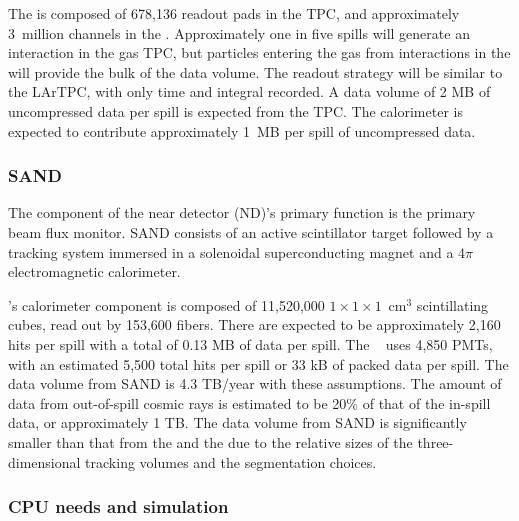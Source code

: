 The  is composed of 678,136 readout pads in the TPC, and approximately 3~million channels in the .  Approximately one in five spills will generate an interaction in the gas TPC, but particles entering the gas from interactions in the  will provide the bulk of the data volume.  The readout strategy will be similar to the LArTPC, with only time and integral recorded. A  data volume of 2 MB of uncompressed data per spill is expected from the TPC.  The calorimeter is expected to contribute approximately 1~MB per spill of uncompressed data.




\subsubsection{SAND}
\label{sec:comp-dataestimates-sand}

The  component of the near detector (ND)'s primary function is the primary beam flux monitor.   SAND consists of an active scintillator target  followed by a tracking system immersed in a solenoidal superconducting magnet  and  a $4\pi$ electromagnetic calorimeter.

's  calorimeter component is composed of 11,520,000 $1\times 1\times 1$~cm$^3$ scintillating cubes, read out by 153,600 fibers.  There are expected to be approximately 2,160 hits per spill with a total of 0.13 MB of data per spill.  The  ~\cite{Adinolfi:2002zx} uses 4,850 PMTs, with an estimated 5,500 total hits per spill or 33 kB of packed data per spill.   The data volume from SAND is 4.3 TB/year with these assumptions.  The amount of data from out-of-spill cosmic rays is estimated to be 20\% of that of the in-spill data, or approximately 1 TB.  The data volume from SAND is significantly smaller than that from the  and the  due to the relative sizes of the three-dimensional tracking volumes and the segmentation choices.

\subsubsection{CPU needs and simulation}

